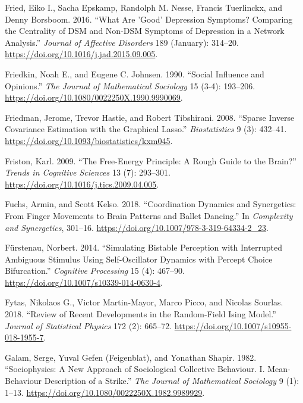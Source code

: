 \documentclass[
  letterpaper,
]{scrbook}
\newlength{\cslhangindent}
\newlength{\cslentryspacingunit} %
\newenvironment{CSLReferences}[2] %
 {%
  \setlength{\parindent}{0pt}
  \ifodd #1
  \let\oldpar\par
  \def\par{\hangindent=\cslhangindent\oldpar}
  \fi
  \setlength{\parskip}{#2\cslentryspacingunit}
 }%
 {}
\begin{document}
\begin{CSLReferences}{1}{0}
\leavevmode{}%
Fried, Eiko I., Sacha Epskamp, Randolph M. Nesse, Francis Tuerlinckx,
and Denny Borsboom. 2016. {``What Are 'Good' Depression Symptoms?
{Comparing} the Centrality of {DSM} and Non-{DSM} Symptoms of Depression
in a Network Analysis.''} \emph{Journal of Affective Disorders} 189
(January): 314--20. \url{https://doi.org/10.1016/j.jad.2015.09.005}.

\leavevmode{}%
Friedkin, Noah E., and Eugene C. Johnsen. 1990. {``Social Influence and
Opinions.''} \emph{The Journal of Mathematical Sociology} 15 (3-4):
193--206. \url{https://doi.org/10.1080/0022250X.1990.9990069}.

\leavevmode{}%
Friedman, Jerome, Trevor Hastie, and Robert Tibshirani. 2008. {``Sparse
Inverse Covariance Estimation with the Graphical Lasso.''}
\emph{Biostatistics} 9 (3): 432--41.
\url{https://doi.org/10.1093/biostatistics/kxm045}.

\leavevmode{}%
Friston, Karl. 2009. {``The Free-Energy Principle: A Rough Guide to the
Brain?''} \emph{Trends in Cognitive Sciences} 13 (7): 293--301.
\url{https://doi.org/10.1016/j.tics.2009.04.005}.

\leavevmode{}%
Fuchs, Armin, and Scott Kelso. 2018. {``Coordination {Dynamics} and
{Synergetics}: {From Finger Movements} to {Brain Patterns} and {Ballet
Dancing}.''} In \emph{Complexity and {Synergetics}}, 301--16.
\url{https://doi.org/10.1007/978-3-319-64334-2_23}.

\leavevmode{}%
Fürstenau, Norbert. 2014. {``Simulating Bistable Perception with
Interrupted Ambiguous Stimulus Using Self-Oscillator Dynamics with
Percept Choice Bifurcation.''} \emph{Cognitive Processing} 15 (4):
467--90. \url{https://doi.org/10.1007/s10339-014-0630-4}.

\leavevmode{}%
Fytas, Nikolaos G., Victor Martin-Mayor, Marco Picco, and Nicolas
Sourlas. 2018. {``Review of Recent Developments in the Random-Field
{Ising} Model.''} \emph{Journal of Statistical Physics} 172 (2):
665--72. \url{https://doi.org/10.1007/s10955-018-1955-7}.

\leavevmode{}%
Galam, Serge, Yuval Gefen (Feigenblat), and Yonathan Shapir. 1982.
{``Sociophysics: {A} New Approach of Sociological Collective Behaviour.
{I}. Mean-Behaviour Description of a Strike.''} \emph{The Journal of
Mathematical Sociology} 9 (1): 1--13.
\url{https://doi.org/10.1080/0022250X.1982.9989929}.


\end{CSLReferences}
\end{document}

